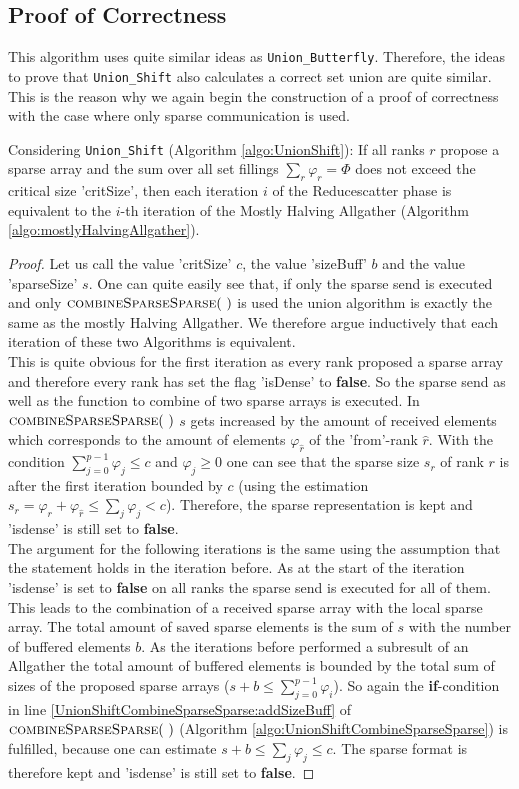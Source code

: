 \subsection{Proof of Correctness}
This algorithm uses quite similar ideas as \texttt{Union\_Butterfly}. Therefore, the ideas to prove that \texttt{Union\_Shift} also calculates a correct set union are quite similar. This is the reason why we again begin the construction of a proof of correctness with the case where only sparse communication is used.
\begin{lemma}
	Considering \texttt{Union\_Shift} (Algorithm \ref{algo:UnionShift}): If all ranks $r$ propose a sparse array and the sum over all set fillings $\sum_r\varphi_r=\Phi$ does not exceed the critical size 'critSize', then each iteration $i$ of the Reducescatter phase is equivalent to the $i$-th iteration of the Mostly Halving Allgather (Algorithm \ref{algo:mostlyHalvingAllgather}).
\end{lemma}
\begin{proof}
	Let us call the value 'critSize' $c$, the value 'sizeBuff' $b$ and the value 'sparseSize' $s$. One can quite easily see that, if only the sparse send is executed and only $\Call{combineSparseSparse}{~}$ is used the union algorithm is exactly the same as the mostly Halving Allgather. We therefore argue inductively that each iteration of these two Algorithms is equivalent.\\
	This is quite obvious for the first iteration as every rank proposed a sparse array and therefore every rank has set the flag 'isDense' to \textbf{false}. So the sparse send as well as the function to combine of two sparse arrays is executed. In $\Call{combineSparseSparse}{~}$ $s$ gets increased by the amount of received elements which corresponds to the amount of elements $\varphi_{\hat{r}}$ of the 'from'-rank $\hat{r}$. With the condition $\sum_{j=0}^{p-1} \varphi_j\leq c$ and  $\varphi_j \geq 0$ one can see that the sparse size $s_r$  of rank $r$ is after the first iteration bounded by $c$ (using the estimation $s_r = \varphi_r + \varphi_{\hat{r}} \leq\sum_j\varphi_j<c$). Therefore, the sparse representation is kept and 'isdense' is still set to \textbf{false}.\\
	The argument for the following iterations is the same using the assumption that the statement holds in the iteration before. As at the start of the iteration 'isdense' is set to \textbf{false} on all ranks the sparse send is executed for all of them. This leads to the combination of a received sparse array with the local sparse array. The total amount of saved sparse elements is the sum of $s$ with the number of buffered elements $b$. As the iterations before performed a  subresult of an Allgather the total amount of buffered elements is bounded by the total sum of sizes of the proposed sparse arrays ($s+b\leq \sum_{j=0}^{p-1} \varphi_i$). So again the \textbf{if}-condition in line \ref{UnionShiftCombineSparseSparse:addSizeBuff} of $\Call{combineSparseSparse}{~}$ (Algorithm \ref{algo:UnionShiftCombineSparseSparse}) is fulfilled, because one can estimate $s+b\leq \sum_j \varphi_j \leq c$. The sparse format is therefore kept and 'isdense' is still set to \textbf{false}.
\end{proof}
